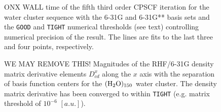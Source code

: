 \documentclass[prl,aps,twocolumn,showpacs,twocolumngrid,superbib]{revtex4}
\begin{document}
\begin{figure}[t]
  \caption{\protect
    ONX WALL time of the fifth third order CPSCF iteration for
    the water cluster sequence with the 6-31G and 6-31G** 
    basis sets and the {\tt GOOD} and {\tt TIGHT} 
    numerical thresholds (see text) controlling numerical
    precision of the result. The lines are fits to the 
    last three and four points, respectively.
  }\label{fig:Gamma_ONX_Timing}
\end{figure}




\begin{figure}[t]
  \caption{\protect
    WE MAY REMOVE THIS!
    Magnitudes of the RHF/6-31G density matrix derivative elements $D^{x}_{cd}$
    along the $x$ axis with the separation of basis function centers
    for the $\rm (H_2O)_{150}$ water cluster. The density matrix 
    derivative has been converged to within {\tt TIGHT} (e.g. 
    matrix threshold of $10^{-6}$ $[a.u.]$).
  }\label{fig:Alpha_Decay}
\end{figure}
\end{document}
